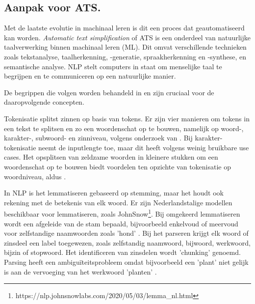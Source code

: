 \subsection{Aanpak voor ATS.}

Met de laatste evolutie in machinaal leren is dit een proces dat geautomatiseerd kan worden. \textit{Automatic text simplification} of ATS is een onderdeel van natuurlijke taalverwerking binnen machinaal leren (ML). Dit omvat verschillende technieken zoals tekstanalyse, taalherkenning, -generatie, spraakherkenning en -synthese, en semantische analyse. NLP stelt computers in staat om menselijke taal te begrijpen en te communiceren op een natuurlijke manier. 

\medspace

De begrippen die volgen worden behandeld in \textcite{Sohom2019, Eisenstein2019} en zijn cruciaal voor de daaropvolgende concepten.

\medspace

Tokenisatie splitst zinnen op basis van tokens. Er zijn vier manieren om tokens in een tekst te splitsen en zo een woordenschat op te bouwen, namelijk op woord-, karakter-, subwoord- en zinniveau, volgens onderzoek van \textcite{Menzli2023}. Bij karakter-tokenisatie neemt de inputlengte toe, maar dit heeft volgens \textcite{Ribeiro2018} weinig bruikbare use cases. Het opsplitsen van zeldzame woorden in kleinere stukken om een woordenschat op te bouwen biedt voordelen ten opzichte van tokenisatie op woordniveau, aldus \autocite{Iredale2022}.

\medspace

In NLP is het lemmatiseren gebaseerd op stemming, maar het houdt ook rekening met de betekenis van elk woord. Er zijn Nederlandstalige modellen beschikbaar voor lemmatiseren, zoals JohnSnow\footnote{https://nlp.johnsnowlabs.com/2020/05/03/lemma\_nl.html}. Bij omgekeerd lemmatiseren wordt een afgeleide van de stam bepaald, bijvoorbeeld enkelvoud of meervoud voor zelfstandige naamwoorden zoals 'hond' \autocite{Eisenstein2019}. Bij het parseren krijgt elk woord of zinsdeel een label toegewezen, zoals zelfstandig naamwoord, bijwoord, werkwoord, bijzin of stopwoord. Het identificeren van zinsdelen wordt 'chunking' genoemd. Parsing heeft een ambiguïteitsprobleem omdat bijvoorbeeld een 'plant' niet gelijk is aan de vervoeging van het werkwoord 'planten' \autocite{Eisenstein2019}.

